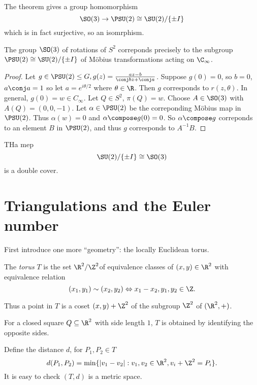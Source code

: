 \documentclass[a4paper]{article}
\theoremstyle{definition}
\begin{document}
The theorem gives a group homomorphism
\[
  \SO(3) \to \PSU(2) \cong \SU(2)/\{\pm I\}
\]
which is in fact surjective, so an isomrphism.

\begin{theorem}
  The group \(\SO(3)\) of rotations of \(S^2\) correponds precisely to the subgroup \(\PSU(2) \cong \SU(2)/\{\pm I\}\) of Möbius transformations acting on \(\C_\infty\).
\end{theorem}

\begin{proof}
  Let \(g \in \PSU(2) \leq G, g(z) = \frac{az - b}{\conj b z + \conj a}\). Suppose \(g(0) = 0\), so \(b = 0\), \(a \conj a = 1\) so let \(a = e^{i\theta/2}\) where \(\theta \in \R\). Then \(g\) corresponds to \(r(z, \theta)\). In general, \(g(0) = w \in C_\infty\). Let \(Q \in S^2\), \(\pi(Q) = w\). Choose \(A \in \SO(3)\) with \(A(Q) = (0, 0, -1)\). Let \(\alpha \in \PSU(2)\) be the correponding Möbius map in \(\PSU(2)\). Thus \(\alpha(w) = 0\) and \(\alpha \compose g(0) = 0\). So \(\alpha \compose g\) correponds to an element \(B\) in \(\PSU(2)\), and thus \(g\) corresponds to \(A^{-1}B\).
\end{proof}

\begin{remark}
  THa mep
  \[
    \SU(2)/\{\pm I\} \cong \SO(3)
  \]
  is a double cover.
\end{remark}

\section{Triangulations and the Euler number}

First introduce one more ``geometry'': the locally Euclidean torus.

\begin{definition}[Torus]
  The \emph{torus} \(T\) is the set \(\R^2/\Z^2\)of equivalence classes of \((x, y) \in \R^2\) with equivalence relation
  \[
    (x_1, y_1) \sim (x_2, y_2) \Leftrightarrow x_1 - x_2, y_1, y_2 \in \Z.
  \]
\end{definition}

Thus a point in \(T\) is a coset \((x, y) + \Z^2\) of the subgroup \(\Z^2\) of \((\R^2, +)\).

For a closed square \(Q \subseteq \R^2\) with side length \(1\), \(T\) is obtained by identifying the opposite sides.

Define the distance \(d\), for \(P_1, P_2 \in T\)
\[
  d(P_1, P_2) = \min \{|v_1 - v_2|: v_1, v_2 \in \R^2, v_i + \Z^2 = P_i\}.
\]
It is easy to check \((T, d)\) is a metric space.
\end{document}
